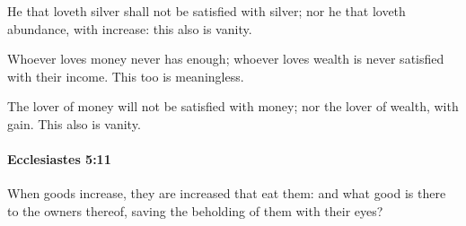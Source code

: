 			\begin{versebox}
					\item[BHS] 
					\item[LXX] 
					\item[ASV] He that loveth silver shall not be satisfied with silver; nor he that loveth abundance, with increase: this also is vanity.
					\item[NIV] Whoever loves money never has enough; whoever loves wealth is never satisfied with their income. This too is meaningless.
					\item[NRSV] The lover of money will not be satisfied with money; nor the lover of wealth, with gain. This also is vanity.
			\end{versebox}

		\paragraph{Ecclesiastes 5:11} %
			\label{ECCLESIASTES-5-11}

			When goods increase, they are increased that eat them: and what good is there to the owners thereof, saving the beholding of them with their eyes?

